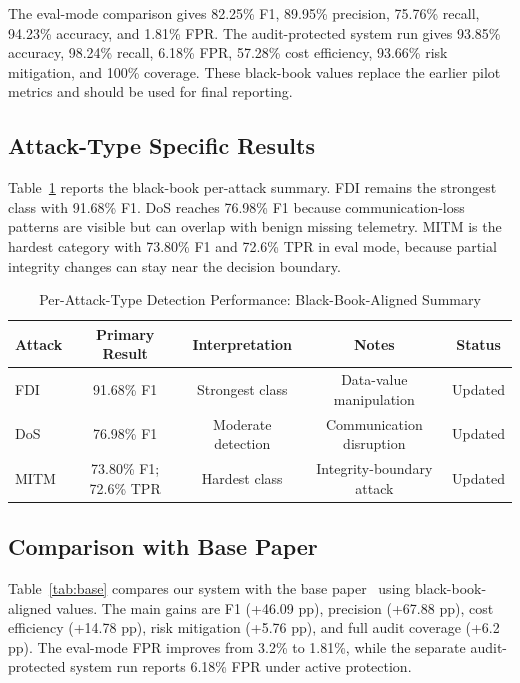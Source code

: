 \documentclass[conference,a4paper]{IEEEtran}
\begin{document}
The eval-mode comparison gives 82.25\% F1, 89.95\% precision, 75.76\% recall, 94.23\% accuracy, and 1.81\% FPR. The audit-protected system run gives 93.85\% accuracy, 98.24\% recall, 6.18\% FPR, 57.28\% cost efficiency, 93.66\% risk mitigation, and 100\% coverage. These black-book values replace the earlier pilot metrics and should be used for final reporting.

\subsection{Attack-Type Specific Results}

Table~\ref{tab:attacktype} reports the black-book per-attack summary. FDI remains the strongest class with 91.68\% F1. DoS reaches 76.98\% F1 because communication-loss patterns are visible but can overlap with benign missing telemetry. MITM is the hardest category with 73.80\% F1 and 72.6\% TPR in eval mode, because partial integrity changes can stay near the decision boundary.

\begin{table}[htbp]
\caption{Per-Attack-Type Detection Performance: Black-Book-Aligned Summary}
\begin{center}
\begin{tabular}{|l|c|c|c|c|}
\hline
\textbf{Attack} & \textbf{Primary Result} & \textbf{Interpretation} & \textbf{Notes} & \textbf{Status} \\
\hline
FDI & 91.68\% F1 & Strongest class & Data-value manipulation & Updated \\
\hline
DoS & 76.98\% F1 & Moderate detection & Communication disruption & Updated \\
\hline
MITM & 73.80\% F1; 72.6\% TPR & Hardest class & Integrity-boundary attack & Updated \\
\hline
\end{tabular}
\label{tab:attacktype}
\end{center}
\end{table}

\subsection{Comparison with Base Paper}

Table~\ref{tab:base} compares our system with the base paper~\cite{b17} using black-book-aligned values. The main gains are F1 (+46.09 pp), precision (+67.88 pp), cost efficiency (+14.78 pp), risk mitigation (+5.76 pp), and full audit coverage (+6.2 pp). The eval-mode FPR improves from 3.2\% to 1.81\%, while the separate audit-protected system run reports 6.18\% FPR under active protection.
\end{document}
